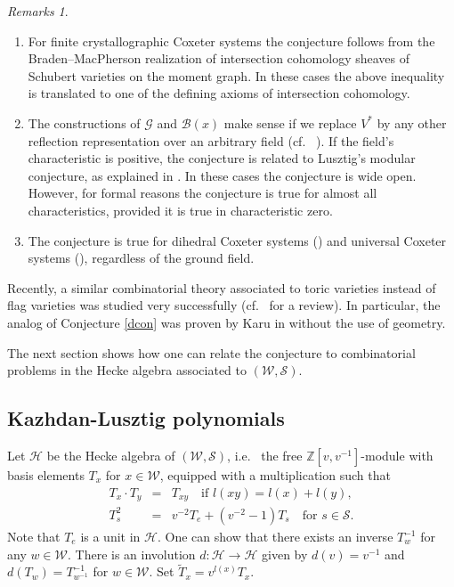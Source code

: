 \documentclass[12pt]{amsart}
\theoremstyle{definition}
\theoremstyle{remark}
\newtheorem{remarks}[theorem]{Remarks}
\newcommand{\CG}{{\mathcal G}}
\newcommand{\CH}{{\mathcal H}}
\newcommand{\CS}{{\mathcal S}}
\newcommand{\CW}{{\mathcal W}}
\newcommand{\SB}{{\mathscr B}}
\newcommand{\DZ}{{\mathbb Z}}
\begin{document}
\begin{remarks}
\begin{enumerate}
\item For finite crystallographic Coxeter systems the conjecture follows from the Braden--MacPherson realization of intersection cohomology sheaves of Schubert varieties on the moment graph. In these cases the above inequality is translated to one of the defining axioms of intersection cohomology.
\item The constructions of $\CG$ and $\SB(x)$  make sense if we replace $V^\ast$ by any other reflection representation over an arbitrary field (cf.~ \cite{Fie2}).  If the field's characteristic is positive, the conjecture is related to Lusztig's modular conjecture, as explained in \cite{Soe2}.  In these cases the conjecture is wide open. However, for formal reasons the conjecture is true for almost all characteristics, provided it is true in characteristic zero.
\item The conjecture is true for dihedral Coxeter systems (\cite{Soe3}) and universal Coxeter systems (\cite{Fie2}), regardless of the ground field.
\end{enumerate}
\end{remarks}

Recently, a similar combinatorial theory associated to toric varieties instead of flag varieties was studied very successfully (cf.~ \cite{B} for a review). In particular, the analog of Conjecture \ref{dcon} was proven by Karu in \cite{Ka} without the use of geometry.

The next section shows how one can relate the conjecture to combinatorial problems in the Hecke algebra associated to $(\CW,\CS)$. 

\subsection{Kazhdan-Lusztig polynomials}

Let $\CH$ be the Hecke algebra of $(\CW,\CS)$, i.e.~ the free $\DZ[v,v^{-1}]$-module with basis elements $T_x$ for $x\in\CW$, equipped with a multiplication such that
\begin{eqnarray*}
{T}_x\cdot {T}_{y} & = & {T}_{xy}\quad\text{if $l(xy)=l(x)+l(y)$}, \\
{T}_s^2 & = & v^{-2}T_e+(v^{-2}-1)T_s \quad\text{for $s\in\CS$}.
\end{eqnarray*}
Note that $T_e$ is a unit in $\CH$. One can show that there exists an inverse $T_w^{-1}$ for any $w\in\CW$. There is an involution $d\colon \CH\to\CH$ given by $d(v)=v^{-1}$ and $d(T_w)=T_{w^{-1}}^{-1}$ for $w\in\CW$. Set $\tilde T_x=v^{l(x)}T_x$. 
\end{document}
